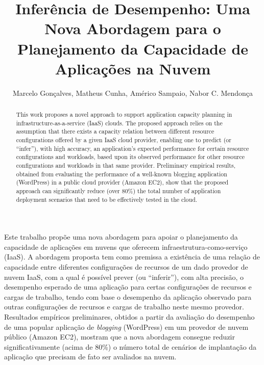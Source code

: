 \documentclass[12pt]{article}
\title{Inferência de Desempenho: Uma Nova Abordagem para o Planejamento da Capacidade de Aplicações na Nuvem}
\author{Marcelo Gonçalves, Matheus Cunha, Américo Sampaio, Nabor C. Mendonça}
\begin{document}
 

\maketitle

\begin{resumo} 


Este trabalho propõe uma nova abordagem para apoiar o planejamento da capacidade de aplicações em nuvens que oferecem infraestrutura-como-serviço (IaaS). A abordagem proposta tem como premissa a existência de uma relação de capacidade entre diferentes configurações de recursos de um dado provedor de nuvem IaaS, com a qual é possível prever (ou ``inferir''), com alta precisão, o desempenho esperado de uma aplicação para certas configurações de recursos e cargas de trabalho, tendo com base o desempenho da aplicação observado para outras configurações de recursos e cargas de trabalho neste mesmo provedor. Resultados empíricos preliminares, obtidos a partir da avaliação do desempenho de uma popular aplicação de \emph{blogging} (WordPress) em um provedor de nuvem público (Amazon EC2), mostram que a nova abordagem consegue reduzir significativamente (acima de 80\%) o número total de cenários de implantação da aplicação que precisam de fato ser avaliados na nuvem.

\end{resumo}

\begin{abstract}


This work proposes a novel approach to support application capacity planning in infrastructure-as-a-service (IaaS) clouds. The proposed approach relies on the assumption that there exists a capacity relation between different resource configurations offered by a given IaaS cloud provider, enabling one to predict (or ``infer''), with high accuracy, an application's expected performance for certain resource configurations and workloads, based upon its observed performance for other resource configurations and workloads in that same provider. Preliminary empirical results, obtained from evaluating the performance of a well-known blogging application (WordPress) in a public cloud provider (Amazon EC2), show that the proposed approach can significantly reduce (over 80\%) the total number of application deployment scenarios that need to be effectively tested in the cloud.

\end{abstract}
\end{document}
